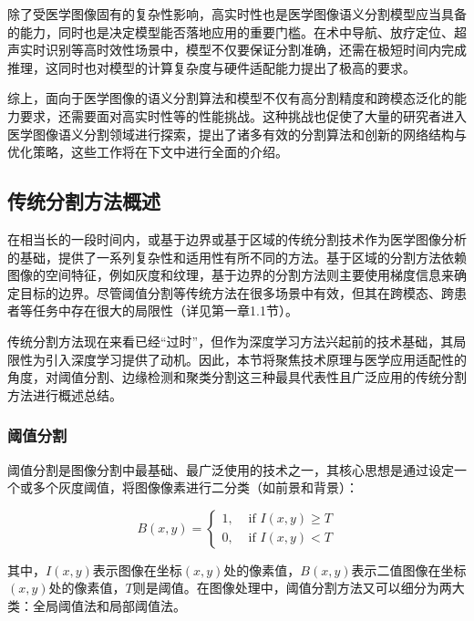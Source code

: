 除了受医学图像固有的复杂性影响，高实时性也是医学图像语义分割模型应当具备的能力，同时也是决定模型能否落地应用的重要门槛。在术中导航、放疗定位、超声实时识别等高时效性场景中，模型不仅要保证分割准确，还需在极短时间内完成推理，这同时也对模型的计算复杂度与硬件适配能力提出了极高的要求。

综上，面向于医学图像的语义分割算法和模型不仅有高分割精度和跨模态泛化的能力要求，还需要面对高实时性等的性能挑战。这种挑战也促使了大量的研究者进入医学图像语义分割领域进行探索，提出了诸多有效的分割算法和创新的网络结构与优化策略，这些工作将在下文中进行全面的介绍。

\subsection{传统分割方法概述}


在相当长的一段时间内，或基于边界或基于区域的传统分割技术作为医学图像分析的基础，提供了一系列复杂性和适用性有所不同的方法。基于区域的分割方法依赖图像的空间特征，例如灰度和纹理，基于边界的分割方法则主要使用梯度信息来确定目标的边界。尽管阈值分割等传统方法在很多场景中有效\cite{xu2024}，但其在跨模态、跨患者等任务中存在很大的局限性（详见第一章1.1节）。

传统分割方法现在来看已经“过时”，但作为深度学习方法兴起前的技术基础，其局限性为引入深度学习提供了动机。因此，本节将聚焦技术原理与医学应用适配性的角度，对阈值分割、边缘检测和聚类分割这三种最具代表性且广泛应用的传统分割方法进行概述总结。

\subsubsection{阈值分割}

阈值分割是图像分割中最基础、最广泛使用的技术之一，其核心思想是通过设定一个或多个灰度阈值，将图像像素进行二分类（如前景和背景）：

\begin{equation}
B(x, y)=\left\{\begin{array}{ll}1, & \text { if } I(x, y) \geq T \\ 0, & \text { if } I(x, y)<T\end{array}\right.
\end{equation}

其中，$I(x, y)$表示图像在坐标$(x, y)$处的像素值，$B(x, y)$表示二值图像在坐标$(x, y)$处的像素值，$T$则是阈值。在图像处理中，阈值分割方法又可以细分为两大类：全局阈值法和局部阈值法。

